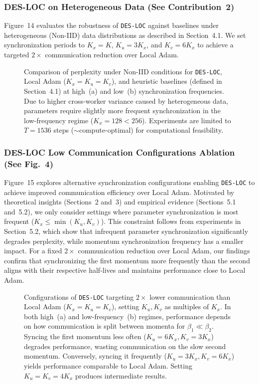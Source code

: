 \subsubsection{DES-LOC on Heterogeneous Data (See Contribution~2)}
\label{sec:b32_heterogeneous}

Figure~14 evaluates the robustness of \texttt{DES-LOC} against baselines under heterogeneous (Non-IID) data distributions as described in Section~4.1. We set synchronization periods to $K_x=K$, $K_u=3K_x$, and $K_v=6K_x$ to achieve a targeted $2\times$ communication reduction over Local Adam.

\begin{figure}[ht]
\centering
\caption{Comparison of perplexity under Non-IID conditions for \texttt{DES-LOC}, Local Adam ($K_x=K_u=K_v$), and heuristic baselines (defined in Section~4.1) at high~(a) and low~(b) synchronization frequencies. Due to higher cross-worker variance caused by heterogeneous data, parameters require slightly more frequent synchronization in the low-frequency regime ($K_x=128<256$). Experiments are limited to $T=1536$ steps ($\sim$compute-optimal) for computational feasibility.}
\label{fig:14}
\end{figure}

\subsubsection{DES-LOC Low Communication Configurations Ablation (See Fig.~4)}
\label{sec:b33_ablation}

Figure~15 explores alternative synchronization configurations enabling \texttt{DES-LOC} to achieve improved communication efficiency over Local Adam. Motivated by theoretical insights (Sections~2 and~3) and empirical evidence (Sections~5.1 and~5.2), we only consider settings where parameter synchronization is most frequent ($K_x \leq \min(K_u, K_v)$). This constraint follows from experiments in Section~5.2, which show that infrequent parameter synchronization significantly degrades perplexity, while momentum synchronization frequency has a smaller impact. For a fixed $2\times$ communication reduction over Local Adam, our findings confirm that synchronizing the first momentum more frequently than the second aligns with their respective half-lives and maintains performance close to Local Adam.

\begin{figure}[ht]
\centering
\caption{Configurations of \texttt{DES-LOC} targeting $2\times$ lower communication than Local Adam ($K_x=K_u=K_v$), setting $K_u, K_v$ as multiples of $K_x$. In both high~(a) and low-frequency~(b) regimes, performance depends on how communication is split between momenta for $\beta_1 \ll \beta_2$. Syncing the first momentum less often ($K_u=6K_x, K_v=3K_x$) degrades performance, wasting communication on the slow second momentum. Conversely, syncing it frequently ($K_u=3K_x, K_v=6K_x$) yields performance comparable to Local Adam. Setting $K_u=K_v=4K_x$ produces intermediate results.}
\label{fig:15}
\end{figure}

